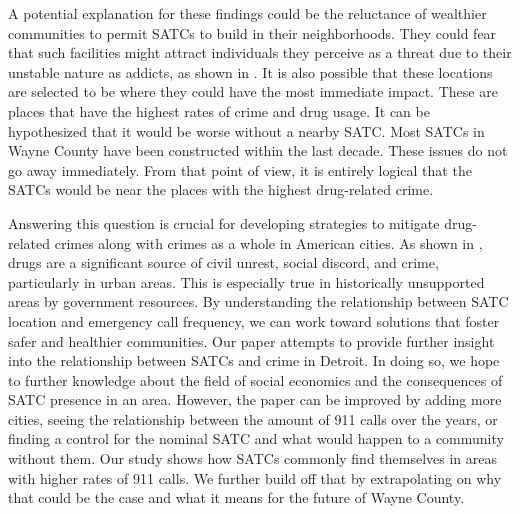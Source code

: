 \documentclass[12pt]{article}
\begin{document}
A potential explanation for these findings could be the reluctance of wealthier communities to permit SATCs to build in their neighborhoods. They could fear that such facilities might attract individuals they perceive as a threat due to their unstable nature as addicts, as shown in \cite{mental_health_and_disability}. It is also possible that these locations are selected to be where they could have the most immediate impact. These are places that have the highest rates of crime and drug usage. It can be hypothesized that it would be worse without a nearby SATC. Most SATCs in Wayne County have been constructed within the last decade. These issues do not go away immediately. From that point of view, it is entirely logical that the SATCs would be near the places with the highest drug-related crime.

Answering this question is crucial for developing strategies to mitigate drug-related crimes along with crimes as a whole in American cities. As shown in \cite{SAT_centers_and_crime}, drugs are a significant source of civil unrest, social discord, and crime, particularly in urban areas. This is especially true in historically unsupported areas by government resources. By understanding the relationship between SATC location and emergency call frequency, we can work toward solutions that foster safer and healthier communities. Our paper attempts to provide further insight into the relationship between SATCs and crime in Detroit. In doing so, we hope to further knowledge about the field of social economics and the consequences of SATC presence in an area. However, the paper can be improved by adding more cities, seeing the relationship between the amount of 911 calls over the years, or finding a control for the nominal SATC and what would happen to a community without them. Our study shows how SATCs commonly find themselves in areas with higher rates of 911 calls. We further build off that by extrapolating on why that could be the case and what it means for the future of Wayne County.
\end{document}
